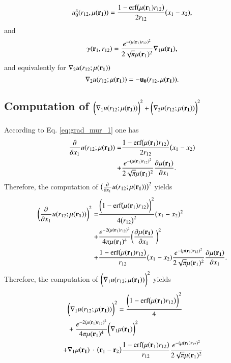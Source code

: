 \documentclass[aip,jcp,reprint,noshowkeys,superscriptaddress]{revtex4-1}
\newcommand{\deriv}[3]{\frac{\partial^{#3} #1}{\partial {#2}^{#3}}}
\newcommand{\br}[0]{{\bf {r}}}
\newcommand{\bri}[1]{{\bf r}_{#1}}
\newcommand{\mur}[1]{\mu({\bf r_{#1}})}
\begin{document}
\begin{equation}
 \label{eq:dev_u0_x}
 u_0^x(r_{12},\mur{1}) = \frac{1 - \text{erf}\big(\mu(\bri{1}) r_{12} \big)}{2 r_{12}}\big( x_1 - x_2),
\end{equation}
and
\begin{equation}
 \label{eq:dev_gamma_1}
 {\bf {\gamma}}(\br_1, r_{12}) = \frac{e^{-(\mu(\bri{1}) r_{12})^2}}{2 \sqrt{\pi} \mu(\bri{1})^2} \nabla_1{\mur{1}},
\end{equation}
and equivalently for $\nabla_2 u(r_{12};\mur{1})$  
\begin{equation}
 \label{eq:nabla_2}
 \nabla_2 u(r_{12};\mur{1}) = - {\bf u_0}(r_{12},\mur{1}).
\end{equation}

\subsection{Computation of $\bigg( \nabla_1  u(r_{12};\mur{1})\bigg)^2 + \bigg( \nabla_2  u(r_{12};\mur{1})\bigg)^2$ }
According to Eq. \eqref{eq:grad_mur_1} one has 
\begin{equation}
 \begin{aligned}
 \deriv{}{x_1}{} u(r_{12};\mur{1}) =& \frac{1 - \text{erf}\big(\mu(\bri{1}) r_{12} \big)}{2 r_{12}}\big( x_1 - x_2) \\
                                   +&\frac{e^{-(\mu(\bri{1}) r_{12})^2}}{2 \sqrt{\pi} \mu(\bri{1})^2} \deriv{\mur{1}}{x_1}{}.  
 \end{aligned}
\end{equation}
Therefore, the computation of $\big( \deriv{}{x_1}{} u(r_{12};\mur{1}) \big)^2$ yields 
\begin{equation}
 \begin{aligned}
 \bigg( \deriv{}{x_1}{} u(r_{12};\mur{1}) \bigg)^2 = & \frac{\bigg(1 - \text{erf}\big(\mu(\bri{1}) r_{12} \big)\bigg)^2}{4 \big(r_{12}\big)^2}\big( x_1 - x_2)^2 \\
 + & \frac{e^{-2(\mu(\bri{1}) r_{12})^2}}{4 \pi \mu(\bri{1})^4} \bigg(\deriv{\mur{1}}{x_1}{} \bigg)^2 \\ 
 + & \frac{1 - \text{erf}\big(\mu(\bri{1}) r_{12} \big)}{r_{12}}\big( x_1 - x_2) \frac{e^{-(\mu(\bri{1}) r_{12})^2}}{2 \sqrt{\pi} \mu(\bri{1})^2} \deriv{\mur{1}}{x_1}{}.
 \end{aligned}
\end{equation}
Therefore, the computation of $\bigg( \nabla_1  u(r_{12};\mur{1})\bigg)^2$ yields 
\begin{equation}
 \begin{aligned}
 & \bigg( \nabla_1  u(r_{12};\mur{1})\bigg)^2  = \frac{\bigg(1 - \text{erf}\big(\mu(\bri{1}) r_{12} \big)\bigg)^2}{4} \\
 & +   \frac{e^{-2(\mu(\bri{1}) r_{12})^2}}{4 \pi \mu(\bri{1})^4} \bigg( \nabla_1  \mur{1}\bigg)^2 \\ 
   + & \nabla_1  \mur{1} \, \cdot \, \big( \br{}_1 - \br{}_2\big) \frac{1 - \text{erf}\big(\mu(\bri{1}) r_{12} \big)}{r_{12}} \frac{e^{-(\mu(\bri{1}) r_{12})^2}}{2 \sqrt{\pi}\mu(\bri{1})^2} 
 \end{aligned}
\end{equation}
\end{document}
